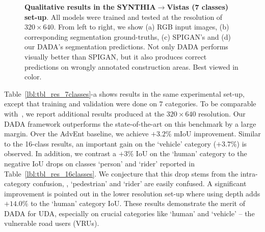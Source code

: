 \documentclass[10pt,twocolumn,letterpaper]{article}
\begin{document}
\begin{figure*}[t!]
\begin{center}
\begin{subfigure}[t]{0.24\textwidth}
		\end{subfigure}
	\end{center}
	\vspace{-0.3cm}
	\caption{\small \textbf{Qualitative results in the SYNTHIA$\rightarrow$Vistas (7 classes) set-up}. All models were trained and tested at the resolution of $320\times640$. From left to right, we show (a) RGB input images, (b) corresponding segmentation ground-truths, (c) SPIGAN's and (d) our DADA's segmentation predictions. Not only DADA performs visually better than SPIGAN, but it also produces correct predictions on wrongly annotated construction areas. Best viewed in color.}
	\label{fig:sup_qual_seg}
\end{figure*}

Table~\ref{lbl:tbl_res_7classes}-a shows results in the same experimental set-up, except that training and validation were done on $7$ categories.
To be comparable with~\cite{lee2018spigan}, we report additional results produced at the $320\times640$ resolution.
Our DADA framework outperforms the state-of-the-art on this benchmark by a large margin.
Over the AdvEnt baseline, we achieve $+3.2\%$ mIoU improvement.
Similar to the 16-class results, an important gain on the `vehicle' category ($+3.7\%$) is observed.
In addition, we contrast a $+3\%$ IoU on the `human' category to the negative IoU drops on classes `person' and `rider' reported in Table~\ref{lbl:tbl_res_16classes}.
We conjecture that this drop stems from the intra-category confusion, \ie, `pedestrian' and `rider' are easily confused.
A significant improvement is pointed out in the lower resolution set-up where using depth adds $+14.0\%$ to the `human' category IoU.
These results demonstrate the merit of DADA for UDA, especially on crucial categories like `human' and `vehicle' -- the vulnerable road users (VRUs).
\end{document}
